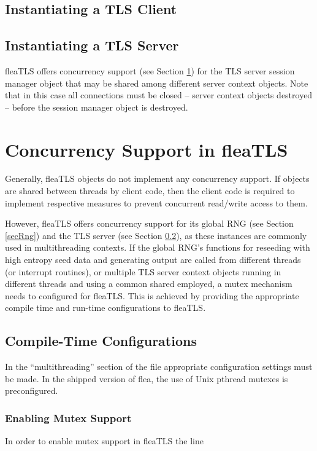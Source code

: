 \documentclass[a4paper,11pt]{scrartcl}
\begin{document}
\subsection{Instantiating a TLS Client}

\subsection{Instantiating a TLS Server}
\label{secTlsServer}
fleaTLS offers concurrency support (see Section \ref{secConcurrency}) for the TLS server session manager object
that may be shared among different server context objects. Note that in this
case all connections must be closed -- \ie server context objects destroyed -- before the session manager object is destroyed.


\section{Concurrency Support in fleaTLS}

\label{secConcurrency}
Generally, fleaTLS objects do not implement any concurrency support. If  
objects are shared between threads by client code, then the client code is
required to implement respective measures to prevent concurrent read/write
access to them.

However, fleaTLS offers concurrency support for its global RNG (see Section \ref{secRng})
and the TLS server (see Section \ref{secTlsServer}), as these instances are
commonly used in multithreading contexts. If the global RNG's
functions for reseeding with high entropy seed data and generating output are
called from different threads (or interrupt routines), or multiple TLS
server context objects running in different threads and using a common shared
 employed, a mutex mechanism needs
to configured for fleaTLS. This is achieved by providing the appropriate compile
time and run-time configurations to fleaTLS.

\subsection{Compile-Time Configurations}

In the ``multithreading'' section of the file  
appropriate configuration settings must be made. In the shipped version of flea,
the use of Unix pthread mutexes is preconfigured. 

\subsubsection{Enabling Mutex Support}
In order to enable mutex support in fleaTLS the line 
\end{document}
